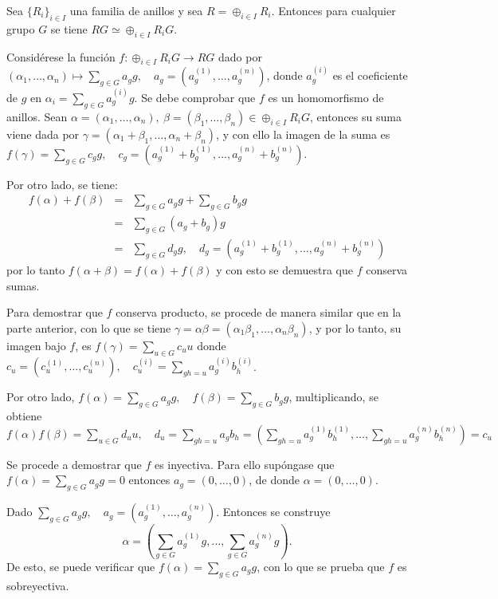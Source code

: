 \begin{lema}\label{lema2}
Sea $\{R_i\}_{i\in I}$ una familia de anillos y sea $R = \oplus_{i \in I}R_i$. Entonces para cualquier grupo $G$ se tiene $RG \simeq \oplus_{i \in I}R_iG$.
\end{lema}
\begin{proof*}
Considérese la función $f \colon \oplus_{i \in I}R_iG \to RG$ dado por $(\alpha_1, \dots, \alpha_n) \mapsto \sum_{g \in G}a_gg, \quad a_g = (a_g^{(1)}, \dots, a_g ^{(n)})$, donde $a_g^{(i)}$ es el coeficiente de $g$ en $\alpha_i = \sum_{g \in G}a_g^{(i)}g$. Se debe comprobar que $f$ es un homomorfismo de anillos.
Sean $\alpha = (\alpha_1, \dots, \alpha_n), \  \beta = (\beta_1, \dots, \beta_n) \in \oplus_{i \in I}R_iG$, entonces su suma viene dada por $\gamma = (\alpha_1 + \beta_1, \dots, \alpha_n + \beta_n)$, y con ello la imagen de la suma es $f(\gamma) = \sum_{g \in G}c_gg, \quad c_g = (a_g^{(1)}+b_g^{(1)}, \dots, a_g^{(n)}+b_g^{(n)})$. 

Por otro lado, se tiene:
\begin{eqnarray*}
f(\alpha) + f(\beta) &=& \sum_{g \in G}a_gg + \sum_{g\in G}b_gg\\
 &=& \sum_{g \in G}(a_g + b_g)g \\
  & = &  \sum_{g \in G}d_gg, \quad d_g = (a_g^{(1)} + b_g^{(1)}, \dots, a_g^{(n)} + b_g^{(n)} )
\end{eqnarray*}
por lo tanto $f(\alpha + \beta) = f(\alpha) + f(\beta)$ y con esto se demuestra que $f$ conserva sumas.

Para demostrar que $f$ conserva producto, se procede de manera similar que en la parte anterior, con lo que se  tiene $\gamma = \alpha\beta = (\alpha_1\beta_1, \dots, \alpha_n\beta_n)$, y por lo tanto, su imagen bajo $f$, es $f(\gamma) = \sum_{u \in G}c_uu$ donde $c_u = (c_u^{(1)}, \dots, c_u^{(n)}), \quad c_u^{(i)} = \sum_{gh=u}a_g^{(i)}b_h^{(i)}$.

Por otro lado, $f(\alpha) = \sum_{g \in G}a_gg, \quad f(\beta) = \sum_{g \in G}b_gg$, multiplicando, se obtiene $f(\alpha)f(\beta) = \sum_{u \in G}d_uu, \quad d_u = \sum_{gh = u }a_gb_h = \left( \sum_{gh=u}a_g^{(1)}b_h^{(1)}, \dots, \sum_{gh=u}a_g^{(n)}b_h^{(n) } \right)=c_u$

Se procede a demostrar que $f$ es inyectiva. Para ello supóngase que $f(\alpha) = \sum_{g\in G}a_gg = 0$ entonces $a_g = (0, \dots, 0)$, de donde $\alpha = (0, \dots, 0)$. 

Dado $\sum_{g \in G}a_gg, \quad a_g = (a_g^{(1)}, \dots, a_g^{(n)})$. Entonces se construye \[\alpha= \left( \sum_{g\in G}a_g^{(1)}g, \dots, \sum_{g\in G}a_g^{(n)}g  \right).\] De esto, se puede verificar que $f(\alpha) = \sum_{g \in G}a_gg$, con lo que se prueba que $f$ es sobreyectiva. \qedhere
\end{proof*}
